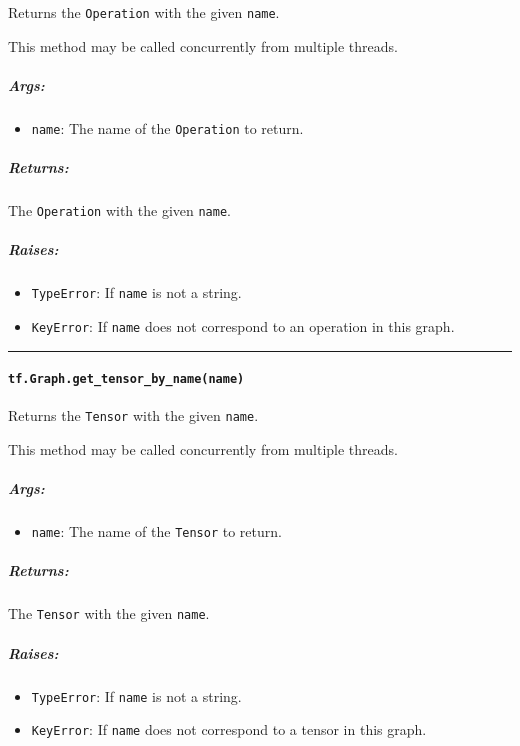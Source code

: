 Returns the \lstinline{Operation} with the given \lstinline{name}.

This method may be called concurrently from multiple threads.

\subparagraph{Args: }\label{args-7}

\begin{itemize}
\item \lstinline{name}: The name of the \lstinline{Operation} to return.
\end{itemize}

\subparagraph{Returns: }\label{returns-7}

The \lstinline{Operation} with the given \lstinline{name}.

\subparagraph{Raises: }\label{raises-2}

\begin{itemize}
\tightlist
\item
  \lstinline{TypeError}: If \lstinline{name} is not a string.
\item
  \lstinline{KeyError}: If \lstinline{name} does not correspond to an
  operation in this graph.
\end{itemize}

\begin{center}\rule{0.5\linewidth}{\linethickness}\end{center}

\paragraph{\texorpdfstring{\lstinline{tf.Graph.get_tensor_by_name(name)}
}{tf.Graph.get_tensor_by_name(name) }}\label{tf.graph.getux5ftensorux5fbyux5fnamename}

Returns the \lstinline{Tensor} with the given \lstinline{name}.

This method may be called concurrently from multiple threads.

\subparagraph{Args: }\label{args-8}

\begin{itemize}
\tightlist
\item
  \lstinline{name}: The name of the \lstinline{Tensor} to return.
\end{itemize}

\subparagraph{Returns: }\label{returns-8}

The \lstinline{Tensor} with the given \lstinline{name}.

\subparagraph{Raises: }\label{raises-3}

\begin{itemize}
\tightlist
\item
  \lstinline{TypeError}: If \lstinline{name} is not a string.
\item
  \lstinline{KeyError}: If \lstinline{name} does not correspond to a tensor in
  this graph.
\end{itemize}

